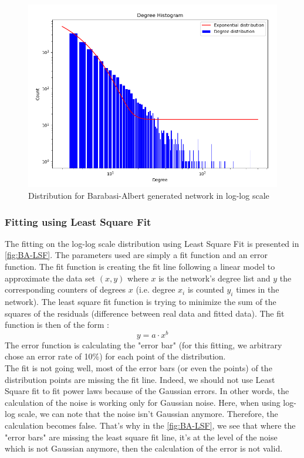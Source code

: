 \documentclass{article}
\begin{document}
\begin{figure}[h]
  \centering
  \includegraphics[scale=0.55]{fig/BA-distribution-log.png}
  \caption{Distribution for Barabasi-Albert generated network in log-log scale}
  \label{fig:BA-distribution-log}
\end{figure}

\subsubsection*{Fitting using Least Square Fit} 

The fitting on the log-log scale distribution using Least Square Fit is presented in \autoref{fig:BA-LSF}. The parameters used are simply a fit function and an error function. The fit function is creating the fit line following a linear model to approximate the data set $(x,y)$ where $x$ is the network's degree list and $y$ the corresponding counters of degrees $x$ (i.e. degree $x_{i}$ is counted $y_{i}$ times in the network). The least square fit function is trying to minimize the sum of the squares of the residuals (difference between real data and fitted data). The fit function is then of the form : 
$$ y = a \cdot x^{b} $$
The error function is calculating the "error bar" (for this fitting, we arbitrary chose an error rate of 10\%) for each point of the distribution.  \\

\noindent
The fit is not going well, most of the error bars (or even the points) of the distribution points are missing the fit line. Indeed, we should not use Least Square fit to fit power laws because of the Gaussian errors. In other words, the calculation of the noise is working only for Gaussian noise. Here, when using log-log scale, we can note that the noise isn't Gaussian anymore. Therefore, the calculation becomes false. That's why in the \autoref{fig:BA-LSF}, we see that where the "error bars" are missing the least square fit line, it's at the level of the noise which is not Gaussian anymore, then the calculation of the error is not valid. 
\end{document}
